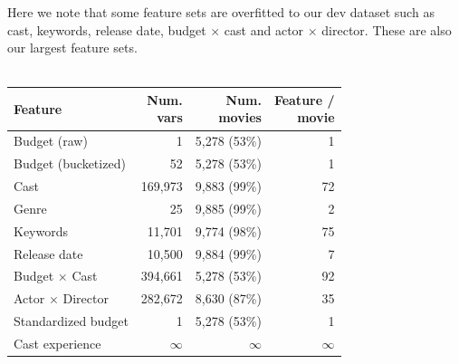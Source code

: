 \documentclass[journal]{IEEEtran}
\begin{document}
\smallskip
\par Here we note that some feature sets are overfitted to our dev dataset such as
cast, keywords, release date, budget $\times$ cast and actor $\times$ director.
These are also our largest feature sets.\\
\\
\begin{tabular}{|l| r r r|} %
\hline
Feature             & \shortstack[c]{Num.\\vars} & \shortstack[c]{Num.\\movies} & \shortstack[c]{Feature / \\ movie}  \\ [0.5ex] %
\hline
Budget (raw)        & 1 & 5,278 (53\%) & 1 \\ %
Budget (bucketized) & 52 & 5,278 (53\%) & 1 \\
Cast                & 169,973 & 9,883 (99\%) & 72 \\
Genre               & 25 & 9,885 (99\%) & 2 \\
Keywords            & 11,701 & 9,774 (98\%) & 75 \\
Release date        & 10,500 & 9,884 (99\%) & 7 \\
\hline
Budget $\times$ Cast & 394,661 & 5,278 (53\%) & 92 \\
Actor $\times$ Director & 282,672 & 8,630 (87\%) & 35 \\
\hline
Standardized budget & 1 & 5,278 (53\%) & 1 \\
Cast experience & $\infty$ & $\infty$ & $\infty$ \\
\hline %
\end{tabular}
\end{document}
